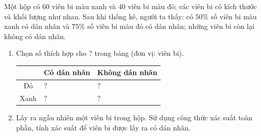 \begin{vd}[CD, Mức độ 3]%
	Một hộp có $60$ viên bi màu xanh và $40$ viên bi màu đỏ; các viên bi có kích thước và khối lượng như nhau. Sau khi thống kê, người ta thấy: có $50\%$ số viên bi màu xanh có dán nhãn và $75\%$ số viên bi màu đỏ có dán nhãn; những viên bi còn lại không có dán nhãn.
	\begin{enumerate}
		\item Chọn số thích hợp cho $\boxed{?}$ trong bảng (đơn vị: viên bi).
		\begin{center}
			\begin{tabular}{|c|C{3cm}|C{3cm}|}
				\hline 
				 & Có dán nhãn & Không dán nhãn \\
				\hline 
				Đỏ & $\boxed{?}$ & $\boxed{?}$ \\
				\hline
				Xanh & $\boxed{?}$ & $\boxed{?}$\\
				\hline
			\end{tabular}
		\end{center}
		\item Lấy ra ngẫu nhiên một viên bi trong hộp. Sử dụng công thức xác suất toàn phần, tính xác suất để viên bi được lấy ra có dán nhãn.
	\end{enumerate}
\end{vd}
